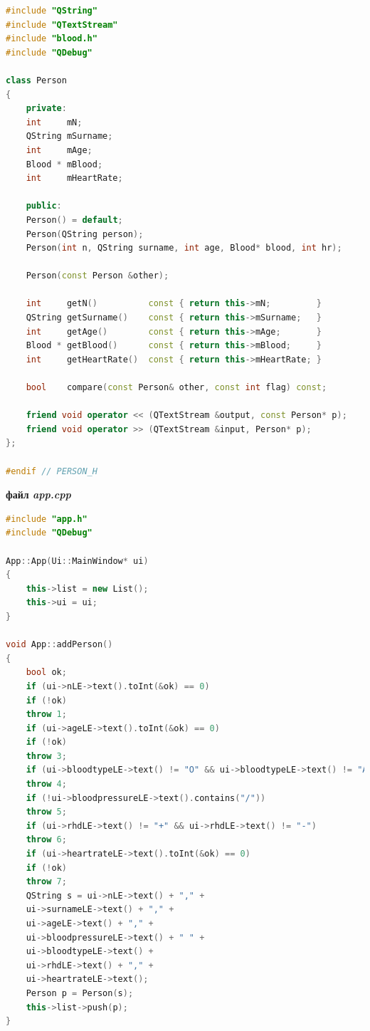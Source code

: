 \documentclass[oneside,14pt]{extarticle}
\begin{document}
\begin{small}
\begin{lstlisting}[language=c++]
#include "QString"
#include "QTextStream"
#include "blood.h"
#include "QDebug"

class Person
{
	private:
	int     mN;
	QString mSurname;
	int     mAge;
	Blood * mBlood;
	int     mHeartRate;
	
	public:
	Person() = default;
	Person(QString person);
	Person(int n, QString surname, int age, Blood* blood, int hr);
	
	Person(const Person &other);
	
	int     getN()          const { return this->mN;         }
	QString getSurname()    const { return this->mSurname;   }
	int     getAge()        const { return this->mAge;       }
	Blood * getBlood()      const { return this->mBlood;     }
	int     getHeartRate()  const { return this->mHeartRate; }
	
	bool    compare(const Person& other, const int flag) const;
	
	friend void operator << (QTextStream &output, const Person* p);
	friend void operator >> (QTextStream &input, Person* p);
};

#endif // PERSON_H

\end{lstlisting}

\textbf{файл \textit{app.cpp}}
\begin{lstlisting}[language=c++]
#include "app.h"
#include "QDebug"

App::App(Ui::MainWindow* ui)
{
	this->list = new List();
	this->ui = ui;
}

void App::addPerson()
{
	bool ok;
	if (ui->nLE->text().toInt(&ok) == 0)
	if (!ok)
	throw 1;
	if (ui->ageLE->text().toInt(&ok) == 0)
	if (!ok)
	throw 3;
	if (ui->bloodtypeLE->text() != "O" && ui->bloodtypeLE->text() != "A" && ui->bloodtypeLE->text() != "B" && ui->bloodtypeLE->text() != "AB")
	throw 4;
	if (!ui->bloodpressureLE->text().contains("/"))
	throw 5;
	if (ui->rhdLE->text() != "+" && ui->rhdLE->text() != "-")
	throw 6;
	if (ui->heartrateLE->text().toInt(&ok) == 0)
	if (!ok)
	throw 7;
	QString s = ui->nLE->text() + "," +
	ui->surnameLE->text() + "," +
	ui->ageLE->text() + "," +
	ui->bloodpressureLE->text() + " " +
	ui->bloodtypeLE->text() +
	ui->rhdLE->text() + "," +
	ui->heartrateLE->text();
	Person p = Person(s);
	this->list->push(p);
}


\end{lstlisting}
\end{small}
\end{document}
